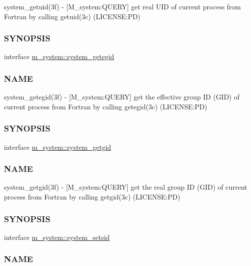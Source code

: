 \begin{DoxyCompactItemize}
\begin{DoxyCompactList}
system\+\_\+getuid(3f) -\/ \mbox{[}M\+\_\+system\+:Q\+U\+E\+RY\mbox{]} get real U\+ID of current process from Fortran by calling getuid(3c) (L\+I\+C\+E\+N\+SE\+:PD) \subsubsection*{S\+Y\+N\+O\+P\+S\+IS}\end{DoxyCompactList}\item 
interface \mbox{\hyperlink{interfacem__system_1_1system__getegid}{m\+\_\+system\+::system\+\_\+getegid}}
\begin{DoxyCompactList}\small\item\em \subsubsection*{N\+A\+ME}

system\+\_\+getegid(3f) -\/ \mbox{[}M\+\_\+system\+:Q\+U\+E\+RY\mbox{]} get the effective group ID (G\+ID) of current process from Fortran by calling getegid(3c) (L\+I\+C\+E\+N\+SE\+:PD) \subsubsection*{S\+Y\+N\+O\+P\+S\+IS}\end{DoxyCompactList}\item 
interface \mbox{\hyperlink{interfacem__system_1_1system__getgid}{m\+\_\+system\+::system\+\_\+getgid}}
\begin{DoxyCompactList}\small\item\em \subsubsection*{N\+A\+ME}

system\+\_\+getgid(3f) -\/ \mbox{[}M\+\_\+system\+:Q\+U\+E\+RY\mbox{]} get the real group ID (G\+ID) of current process from Fortran by calling getgid(3c) (L\+I\+C\+E\+N\+SE\+:PD) \subsubsection*{S\+Y\+N\+O\+P\+S\+IS}\end{DoxyCompactList}\item 
interface \mbox{\hyperlink{interfacem__system_1_1system__setsid}{m\+\_\+system\+::system\+\_\+setsid}}
\begin{DoxyCompactList}\small\item\em \subsubsection*{N\+A\+ME}


\end{DoxyCompactList}
\end{DoxyCompactItemize}
